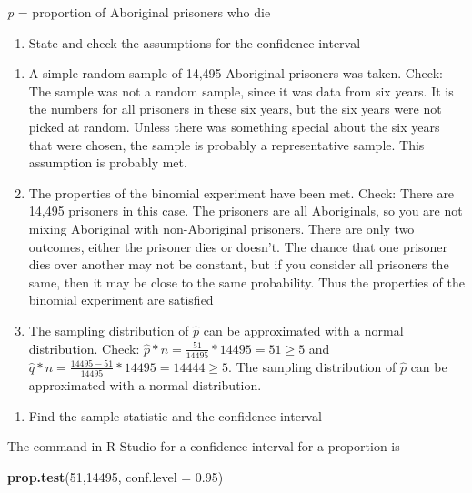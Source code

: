 \documentclass[
]{book}
\newenvironment{Shaded}{\begin{snugshade}}{\end{snugshade}}
\newcommand{\DataTypeTok}[1]{\textcolor[rgb]{0.13,0.29,0.53}{#1}}
\newcommand{\DecValTok}[1]{\textcolor[rgb]{0.00,0.00,0.81}{#1}}
\newcommand{\FloatTok}[1]{\textcolor[rgb]{0.00,0.00,0.81}{#1}}
\newcommand{\KeywordTok}[1]{\textcolor[rgb]{0.13,0.29,0.53}{\textbf{#1}}}
\newcommand{\NormalTok}[1]{#1}
\providecommand{\tightlist}{%
  \setlength{\itemsep}{0pt}\setlength{\parskip}{0pt}}
\begin{document}
\emph{p} = proportion of Aboriginal prisoners who die

\begin{enumerate}
\def\labelenumi{\arabic{enumi}.}
\setcounter{enumi}{1}
\tightlist
\item
  State and check the assumptions for the confidence interval
\end{enumerate}

\begin{enumerate}
\def\labelenumi{\alph{enumi}.}
\item
  A simple random sample of 14,495 Aboriginal prisoners was taken. Check: The sample was not a random sample, since it was data from six years. It is the numbers for all prisoners in these six years, but the six years were not picked at random. Unless there was something special about the six years that were chosen, the sample is probably a representative sample. This assumption is probably met.
\item
  The properties of the binomial experiment have been met. Check: There are 14,495 prisoners in this case. The prisoners are all Aboriginals, so you are not mixing Aboriginal with non-Aboriginal prisoners. There are only two outcomes, either the prisoner dies or doesn't. The chance that one prisoner dies over another may not be constant, but if you consider all prisoners the same, then it may be close to the same probability. Thus the properties of the binomial experiment are satisfied
\item
  The sampling distribution of \(\hat{p}\) can be approximated with a normal distribution. Check: \(\hat{p}*n=\frac{51}{14495}*14495=51\ge5\) and \(\hat{q}*n=\frac{14495-51}{14495}*14495=14444\ge5\). The sampling distribution of \(\hat{p}\) can be approximated with a normal distribution.
\end{enumerate}

\begin{enumerate}
\def\labelenumi{\arabic{enumi}.}
\setcounter{enumi}{2}
\tightlist
\item
  Find the sample statistic and the confidence interval
\end{enumerate}

The command in R Studio for a confidence interval for a proportion is

\begin{Shaded}
\begin{Highlighting}[]
\KeywordTok{prop.test}\NormalTok{(}\DecValTok{51}\NormalTok{,}\DecValTok{14495}\NormalTok{, }\DataTypeTok{conf.level =} \FloatTok{0.95}\NormalTok{)}
\end{Highlighting}
\end{Shaded}
\end{document}
